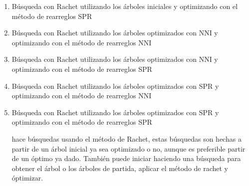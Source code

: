 \begin{itemize}
\begin{enumerate}

\item B\'usqueda con Rachet utilizando los \'arboles iniciales y optimizando con el m\'etodo de rearreglos SPR



\item B\'usqueda con Rachet utilizando los \'arboles optimizados con NNI y optimizando con el m\'etodo de rearreglos NNI




\item B\'usqueda con Rachet utilizando los \'arboles optimizados con NNI y optimizando con el m\'etodo de rearreglos SPR





\item B\'usqueda con Rachet utilizando los \'arboles optimizados con SPR y optimizando con el m\'etodo de rearreglos NNI




\item B\'usqueda con Rachet utilizando los \'arboles optimizados con SPR y optimizando con el m\'etodo de rearreglos SPR





 hace b\'usquedas usando el m\'etodo de Rachet, estas b\'usquedas son hechas a partir de un \'arbol inicial ya sea optimizado o no,  aunque es preferible partir de un \'optimo ya dado. Tambi\'en puede iniciar haciendo una b\'usqueda para obtener el \'arbol o los \'arboles de partida, aplicar el m\'etodo de rachet y \'optimizar.




\end{enumerate}
\end{itemize}
